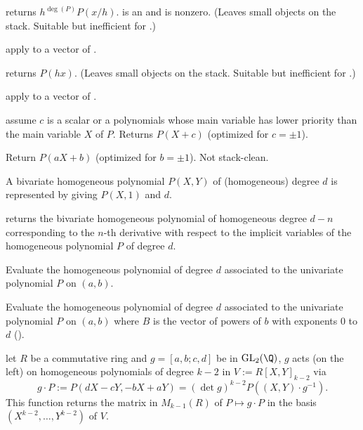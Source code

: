  returns $h^{\deg(P)} P(x/h)$.
 is an  and  is nonzero. (Leaves small objects on the
stack. Suitable but inefficient for .)

 apply  to a vector
of .

 returns $P(h x)$. (Leaves small objects
on the stack. Suitable but inefficient for .)

 apply  to a vector
of .

 assume $c$ is a scalar or
a polynomials whose main variable has lower priority than the main variable
$X$ of $P$. Returns $P(X + c)$ (optimized for $c = \pm 1$).

 Return $P(aX + b)$
(optimized for $b = \pm 1$). Not stack-clean.


A bivariate homogeneous polynomial $P(X,Y)$ of (homogeneous) degree $d$ is
represented by giving $P(X,1)$ and $d$.

 returns the bivariate
homogeneous polynomial of homogeneous degree $d-n$ corresponding to the $n$-th
derivative with respect to the implicit variables of the homogeneous polynomial
$P$ of degree $d$.

Evaluate the homogeneous polynomial of degree $d$ associated to the
univariate polynomial $P$ on $(a,b)$.

Evaluate the homogeneous polynomial of degree $d$ associated to the
univariate polynomial $P$ on $(a,b)$ where $B$ is the vector of powers of $b$
with exponents $0$ to $d$ ().


 let $R$ be a commutative ring
and $g = [a,b;c,d]$ be in $\text{GL}_2(\Q)$, $g$ acts (on the left)
on homogeneous polynomials of degree $k-2$ in $V := R[X,Y]_{k-2}$ via
$$ g\cdot P := P(dX-cY, -bX+aY) = (\det g)^{k-2} P((X,Y)\cdot g^{-1}).$$
This function returns the matrix in $M_{k-1}(R)$ of $P\mapsto g\cdot P$ in
the basis $(X^{k-2},\dots,Y^{k-2})$ of $V$.

